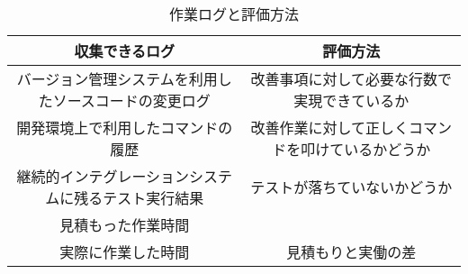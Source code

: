 \begin{table}[ht]
  \begin{center}
    \caption{作業ログと評価方法}
    \begin{tabular}{|c|c|}
      \hline
      収集できるログ & 評価方法 \\
      \hline
      バージョン管理システムを利用したソースコードの変更ログ & 改善事項に対して必要な行数で実現できているか \\
      \hline
      開発環境上で利用したコマンドの履歴 & 改善作業に対して正しくコマンドを叩けているかどうか \\
      \hline
      継続的インテグレーションシステムに残るテスト実行結果 & テストが落ちていないかどうか \\
      \hline
      見積もった作業時間 & \\
      \cline{1-1}
      実際に作業した時間 & 見積もりと実働の差 \\
      \hline
    \end{tabular}
    \label{tab:作業ログと評価方法}
  \end{center}
\end{table}
